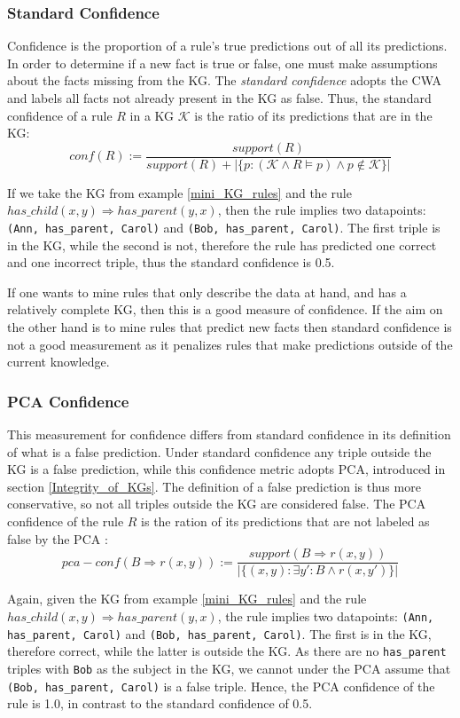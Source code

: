 \subsubsection{Standard Confidence} Confidence is the proportion of a rule's true predictions out of all its predictions. In order to determine if a new fact is true or false, one must make assumptions about the facts missing from the KG. The \textit{standard confidence} adopts the CWA and labels all facts not already present in the KG as false. Thus, the standard confidence of a rule $R$ in a KG $\mathcal{K}$ is the ratio of its predictions that are in the KG:
\[conf(R) := \frac{support(R)}{support(R) + | \{p : (\mathcal{K} \wedge R \models p)\wedge p \not\in \mathcal{K} \}|}\]

If we take the KG from example \ref{mini_KG_rules} and the rule $has\_child(x, y) \Rightarrow has\_parent(y, x)$, then the rule implies two datapoints: \texttt{(Ann, has\_parent, Carol)} and \texttt{(Bob, has\_parent, Carol)}. The first triple is in the KG, while the second is not, therefore the rule has predicted one correct and one incorrect triple, thus the standard confidence is 0.5.


If one wants to mine rules that only describe the data at hand, and has a relatively complete KG, then this is a good measure of confidence. If the aim on the other hand is to mine rules that predict new facts then standard confidence is not a good measurement as it penalizes rules that make predictions outside of the current knowledge.


\subsubsection{PCA Confidence}
This measurement for confidence differs from standard confidence in its definition of what is a false prediction. Under standard confidence any triple outside the KG is a false prediction, while this confidence metric adopts PCA, introduced in section \ref{Integrity_of_KGs}. The definition of a false prediction is thus more conservative, so not all triples outside the KG are considered false. The PCA confidence of the rule $R$ is the ration of its predictions that are not labeled as false by the PCA \cite{amie}:
\[pca-conf(B\Rightarrow r(x, y)) := \frac{support(B\Rightarrow r(x, y))}{|\{(x, y):\exists y' : B \wedge r(x, y')\}|}\]

Again, given the KG from example \ref{mini_KG_rules} and the rule $has\_child(x, y) \Rightarrow has\_parent(y, x)$, the rule implies two datapoints: \texttt{(Ann, has\_parent, Carol)} and \texttt{(Bob, has\_parent, Carol)}. The first is in the KG, therefore correct, while the latter is outside the KG. As there are no \texttt{has\_parent} triples with \texttt{Bob} as the subject in the KG, we cannot under the PCA assume that \texttt{(Bob, has\_parent, Carol)} is a false triple. Hence, the PCA confidence of the rule is 1.0, in contrast to the standard confidence of 0.5.

